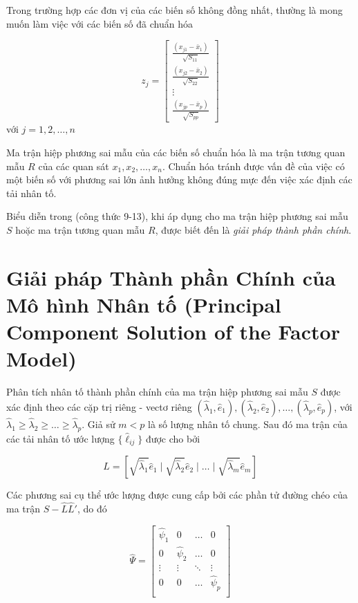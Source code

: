 \documentclass{article}
\begin{document}
Trong trường hợp các đơn vị của các biến số không đồng nhất, thường là mong muốn làm việc với các biến số đã chuẩn hóa

\[
z_j = 
\begin{bmatrix}
\frac{(x_{j1} - \bar{x}_1)}{\sqrt{S_{11}}} \\
\frac{(x_{j2} - \bar{x}_2)}{\sqrt{S_{22}}} \\
\vdots \\
\frac{(x_{jp} - \bar{x}_p)}{\sqrt{S_{pp}}}
\end{bmatrix}
\]
với \( j = 1,2,\ldots,n \)

Ma trận hiệp phương sai mẫu của các biến số chuẩn hóa là ma trận tương quan mẫu \( R \) của các quan sát \( x_1, x_2, \ldots, x_n \). Chuẩn hóa tránh được vấn đề của việc có một biến số với phương sai lớn ảnh hưởng không đúng mực đến việc xác định các tải nhân tố.

Biểu diễn trong (công thức 9-13), khi áp dụng cho ma trận hiệp phương sai mẫu \( S \) hoặc ma trận tương quan mẫu \( R \), được biết đến là \textit{giải pháp thành phần chính}.
\section*{Giải pháp Thành phần Chính của Mô hình Nhân tố (Principal Component Solution of the Factor Model)}

Phân tích nhân tố thành phần chính của ma trận hiệp phương sai mẫu \( S \) được xác định theo các cặp trị riêng - vectơ riêng \( (\hat{\lambda}_1, \hat{e}_1), (\hat{\lambda}_2, \hat{e}_2), \ldots, (\hat{\lambda}_p, \hat{e}_p) \), với \( \hat{\lambda}_1 \geq \hat{\lambda}_2 \geq \ldots \geq \hat{\lambda}_p \). Giả sử \( m < p \) là số lượng nhân tố chung. Sau đó ma trận của các tải nhân tố ước lượng \( \{\hat{\ell}_{ij}\} \) được cho bởi

\[
\hat{L} = \left[ \sqrt{\hat{\lambda}_1} \hat{e}_1 \mid \sqrt{\hat{\lambda}_2} \hat{e}_2 \mid \ldots \mid \sqrt{\hat{\lambda}_m} \hat{e}_m \right]
\]

Các phương sai cụ thể ước lượng được cung cấp bởi các phần tử đường chéo của ma trận \( S - \hat{L}\hat{L}' \), do đó

\[
\hat{\Psi} =
\begin{bmatrix}
\hat{\psi}_1 & 0 & \ldots & 0 \\
0 & \hat{\psi}_2 & \ldots & 0 \\
\vdots & \vdots & \ddots & \vdots \\
0 & 0 & \ldots & \hat{\psi}_p \\
\end{bmatrix}
\]
\end{document}
